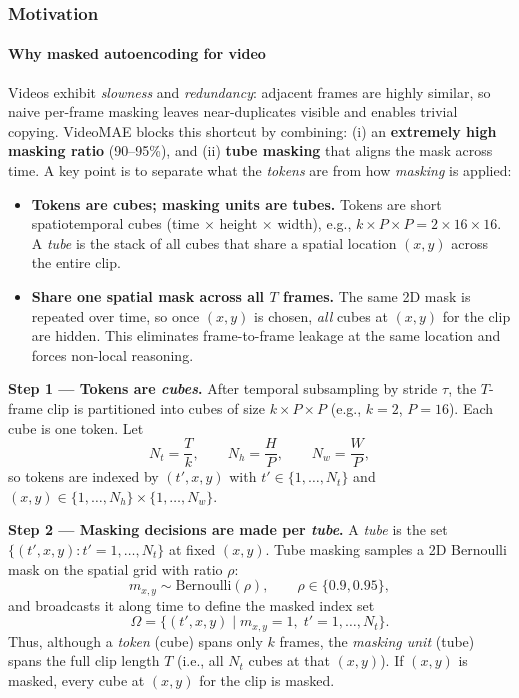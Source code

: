 \begin{enrichment}
\begin{enrichment}
    \subsubsection{Motivation}
    \label{subsubsec_chapter24_videomae_motivation}
    
    \paragraph{Why masked autoencoding for video}
    Videos exhibit \emph{slowness} and \emph{redundancy}: adjacent frames are highly similar, so naive per-frame masking leaves near-duplicates visible and enables trivial copying. VideoMAE blocks this shortcut by combining: (i) an \textbf{extremely high masking ratio} (90--95\%), and (ii) \textbf{tube masking} that aligns the mask across time. A key point is to separate what the \emph{tokens} are from how \emph{masking} is applied:
    
    \begin{itemize}
        \item \textbf{Tokens are cubes; masking units are tubes.} Tokens are short spatio\-temporal cubes (time $\times$ height $\times$ width), e.g., $k{\times}P{\times}P = 2{\times}16{\times}16$. A \emph{tube} is the stack of all cubes that share a spatial location $(x,y)$ across the entire clip.
        \item \textbf{Share one spatial mask across all $T$ frames.} The same 2D mask is repeated over time, so once $(x,y)$ is chosen, \emph{all} cubes at $(x,y)$ for the clip are hidden. This eliminates frame-to-frame leakage at the same location and forces non-local reasoning.
    \end{itemize}
    
    \medskip
    \noindent\textbf{Step 1 --- Tokens are \emph{cubes}.}
    After temporal subsampling by stride $\tau$, the $T$-frame clip is partitioned into cubes of size $k{\times}P{\times}P$ (e.g., $k{=}2$, $P{=}16$). Each cube is one token. Let
    \[
    N_t=\frac{T}{k},\qquad N_h=\frac{H}{P},\qquad N_w=\frac{W}{P},
    \]
    so tokens are indexed by $(t',x,y)$ with $t'\!\in\!\{1,\dots,N_t\}$ and $(x,y)\!\in\!\{1,\dots,N_h\}\times\{1,\dots,N_w\}$.
    
    \newpage 
    
    \noindent\textbf{Step 2 --- Masking decisions are made per \emph{tube}.}
    A \emph{tube} is the set $\{(t',x,y): t'=1,\dots,N_t\}$ at fixed $(x,y)$. Tube masking samples a 2D Bernoulli mask on the spatial grid with ratio $\rho$:
    \[
    m_{x,y}\sim\mathrm{Bernoulli}(\rho),\qquad \rho\in\{0.9,0.95\},
    \]
    and broadcasts it along time to define the masked index set
    \[
    \Omega=\{(t',x,y)\mid m_{x,y}=1,\; t'=1,\dots,N_t\}.
    \]
    Thus, although a \emph{token} (cube) spans only $k$ frames, the \emph{masking unit} (tube) spans the full clip length $T$ (i.e., all $N_t$ cubes at that $(x,y)$). If $(x,y)$ is masked, every cube at $(x,y)$ for the clip is masked.
    

\end{enrichment}
\end{enrichment}
